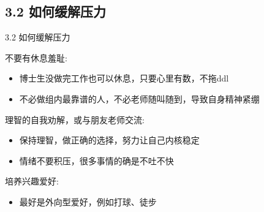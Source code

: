 \documentclass[10pt,aspectratio=43,mathserif,table]{beamer}
\begin{document}
\subsection{3.2 如何缓解压力}
\begin{frame}{\small 3.2 如何缓解压力}
	
	\begin{block}{\footnotesize 不要有休息羞耻:}
		\begin{itemize}
			\item \footnotesize 博士生没做完工作也可以休息，只要心里有数，不拖ddl
		\end{itemize}
		\vspace{0.4em}
		
		\begin{itemize}
			\item \footnotesize 不必做组内最靠谱的人，不必老师随叫随到，导致自身精神紧绷
		\end{itemize}
		\vspace{0.4em}
	\end{block}
	
	
	\begin{block}{\footnotesize 理智的自我劝解，或与朋友老师交流:}
		
		\begin{itemize}
			\item \footnotesize 保持理智，做正确的选择，努力让自己内核稳定
		\end{itemize}
		\vspace{0.4em}		
		
		\begin{itemize}
			\item \footnotesize 情绪不要积压，很多事情的确是不吐不快
		\end{itemize}
		\vspace{0.4em}
		
	\end{block}
	
	
	\begin{block}{\footnotesize 培养兴趣爱好:}
		
		\begin{itemize}
			\item \footnotesize 最好是外向型爱好，例如打球、徒步
		\end{itemize}
		\vspace{0.4em}		
		
	\end{block}
	
\end{frame}
\end{document}
